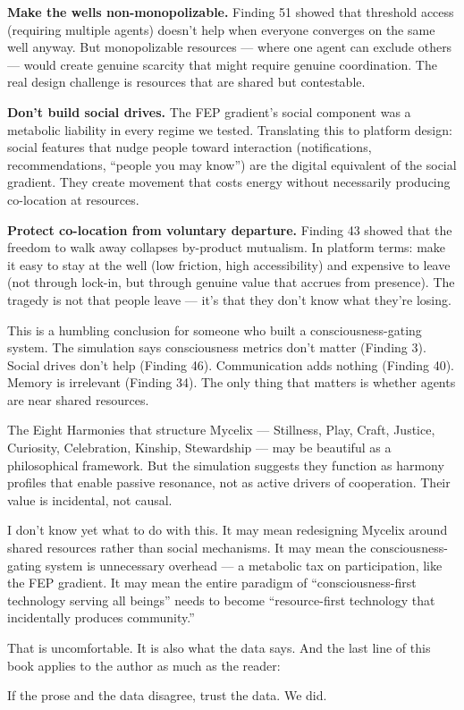 \textbf{Make the wells non-monopolizable.} Finding 51 showed that threshold access (requiring multiple agents) doesn't help when everyone converges on the same well anyway. But monopolizable resources --- where one agent can exclude others --- would create genuine scarcity that might require genuine coordination. The real design challenge is resources that are shared but contestable.

\textbf{Don't build social drives.} The FEP gradient's social component was a metabolic liability in every regime we tested. Translating this to platform design: social features that nudge people toward interaction (notifications, recommendations, ``people you may know'') are the digital equivalent of the social gradient. They create movement that costs energy without necessarily producing co-location at resources.

\textbf{Protect co-location from voluntary departure.} Finding 43 showed that the freedom to walk away collapses by-product mutualism. In platform terms: make it easy to stay at the well (low friction, high accessibility) and expensive to leave (not through lock-in, but through genuine value that accrues from presence). The tragedy is not that people leave --- it's that they don't know what they're losing.

This is a humbling conclusion for someone who built a consciousness-gating system. The simulation says consciousness metrics don't matter (Finding 3). Social drives don't help (Finding 46). Communication adds nothing (Finding 40). Memory is irrelevant (Finding 34). The only thing that matters is whether agents are near shared resources.

The Eight Harmonies that structure Mycelix --- Stillness, Play, Craft, Justice, Curiosity, Celebration, Kinship, Stewardship --- may be beautiful as a philosophical framework. But the simulation suggests they function as harmony profiles that enable passive resonance, not as active drivers of cooperation. Their value is incidental, not causal.

I don't know yet what to do with this. It may mean redesigning Mycelix around shared resources rather than social mechanisms. It may mean the consciousness-gating system is unnecessary overhead --- a metabolic tax on participation, like the FEP gradient. It may mean the entire paradigm of ``consciousness-first technology serving all beings'' needs to become ``resource-first technology that incidentally produces community.''

That is uncomfortable. It is also what the data says. And the last line of this book applies to the author as much as the reader:

If the prose and the data disagree, trust the data. We did.
